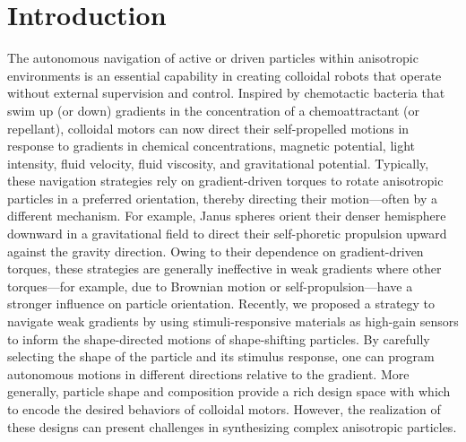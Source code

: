 \section{Introduction}
The autonomous navigation of active or driven particles within anisotropic environments is an essential capability in creating colloidal robots\cite{palagi2018bioinspired,han2018engineering} that operate without external supervision and control. Inspired by chemotactic bacteria that swim up (or down) gradients in the concentration of a chemoattractant (or repellant), colloidal motors can now direct their self-propelled motions in response to gradients in chemical concentrations,\cite{hong2007chemotaxis} magnetic potential,\cite{Kline2005} light intensity,\cite{dai2016programmable,lozano2016phototaxis} fluid velocity,\cite{Palacci2015,ren2017rheotaxis} fluid viscosity,\cite{liebchen2018viscotaxis} and gravitational potential.\cite{campbell2013gravitaxis,ten2014gravitaxis} Typically, these navigation strategies rely on gradient-driven torques to rotate anisotropic particles in a preferred orientation, thereby directing their motion---often by a different mechanism. For example, Janus spheres orient their denser hemisphere downward in a gravitational field to direct their self-phoretic propulsion upward against the gravity direction.\cite{campbell2013gravitaxis} Owing to their dependence on gradient-driven torques, these strategies are generally ineffective in weak gradients where other torques---for example, due to Brownian motion or self-propulsion---have a stronger influence on particle orientation.  Recently, we proposed a strategy to navigate weak gradients by using stimuli-responsive materials as high-gain sensors to inform the shape-directed motions of shape-shifting particles.\cite{dou2019autonomous} By carefully selecting the shape of the particle and its stimulus response, one can program autonomous motions in different directions relative to the gradient. More generally, particle shape\cite{brooks2018shape,sabrina2018shape,brooks2019shape} and composition\cite{lee2019directed} provide a rich design space with which to encode the desired behaviors of colloidal motors. However, the realization of these designs can present challenges in synthesizing complex anisotropic particles.
 
